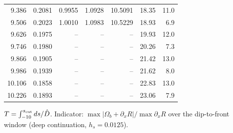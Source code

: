 \begin{tabular}{rrrrrrr}
9.386 & 0.2081 & 0.9955 & 1.0928 & 10.5091 & 18.35 & 11.0\\
9.506 & 0.2023 & 1.0010 & 1.0983 & 10.5229 & 18.93 & 6.9\\
9.626 & 0.1975 & -- & -- & -- & 19.93 & 12.0\\
9.746 & 0.1980 & -- & -- & -- & 20.26 & 7.3\\
9.866 & 0.1905 & -- & -- & -- & 21.42 & 13.0\\
9.986 & 0.1939 & -- & -- & -- & 21.62 & 8.0\\
10.106 & 0.1858 & -- & -- & -- & 22.83 & 13.0\\
10.226 & 0.1893 & -- & -- & -- & 23.06 & 7.9\\
\bottomrule
\end{tabular}

\smallskip\par\footnotesize $T=\int_{-10}^{s_{\rm cut}}ds/\hat D$. Indicator: $\max|\Omega_b+\partial_xR|/\max\partial_xR$ over the dip-to-front window (deep continuation, $h_s=0.0125$).
